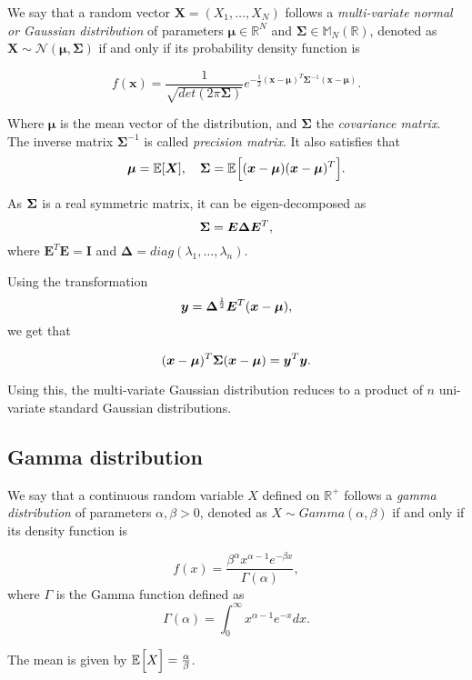 \begin{definition}
We say that a random vector \(\bm{X} = (X_1,\dots,X_N)\) follows a \emph{multi-variate normal or Gaussian distribution} of parameters \(\bm{\mu} \in \mathbb{R}^N\) and \(\bm{\Sigma}
\in \mathbb{M}_N(\mathbb{R})\), denoted as \(\bm{X} \sim \mathcal{N}(\bm{\mu},
\bm{\Sigma})\) if and only if its probability density function is

\[
  f(\bm{x}) = \frac{1}{\sqrt{det(2\pi \bm{\Sigma})}}e^{-\frac{1}{2}(\bm{x} - \bm{\mu})^T\bm{\Sigma}^{-1}(\bm{x}-\bm{\mu})} .
\]

Where \(\bm{\mu}\) is the mean vector of the distribution, and \(\bm{\Sigma}\)
the \emph{covariance matrix}. The inverse matrix \(\bm{\Sigma}^{-1}\) is called \emph{precision matrix}.
It also satisfies that
\[
\bm{\mu} = \mathbb{E}[\bm{X}], \quad \bm{\Sigma} = \mathbb{E}_{}\Big[(\bm{x} - \bm{\mu})(\bm{x} - \bm{\mu})^T\Big].
\]

As \(\bm{\Sigma}\) is a real symmetric matrix, it can be eigen-decomposed as
\[
  \bm{\Sigma} = \bm{E}\bm{\Delta}\bm{E}^T,
\]
where \(\bm{E}^T\bm{E} = \bm{I}\) and \(\bm{\Delta} =
diag(\lambda_1,\dots,\lambda_n)\).

Using the transformation
\[
  \bm{y} = \bm{\Delta}^{\frac{1}{2}}\bm{E}^T(\bm{x} - \bm{\mu}),
\]
we get that

\[
  (\bm{x} - \bm{\mu})^T\bm{\Sigma}(\bm{x} - \bm{\mu}) = \bm{y}^T\bm{y}.
\]

Using this, the multi-variate Gaussian distribution reduces to a product of \(n\)
uni-variate standard Gaussian distributions.

\end{definition}

\subsection*{Gamma distribution}

\begin{definition}

We say that a continuous random variable \(X\) defined on \(\mathbb{R}^{+}\)  follows a \emph{gamma distribution} of parameters \(\alpha, \beta > 0\), denoted as \(X \sim Gamma(\alpha, \beta)\) if and only if its density function is

\[
  f(x) = \frac{\beta^{\alpha} x^{\alpha-1}e^{-\beta x}}{\Gamma(\alpha)},
\]
where \(\Gamma\) is the Gamma function defined as
\[
  \Gamma(\alpha) = \int_{0}^{\infty}x^{\alpha-1}e^{-x} dx.
\]
\end{definition}

The mean is given by \(\mathbb{E}_{}\Big[X\Big] = \frac{\alpha}{\beta}\).

